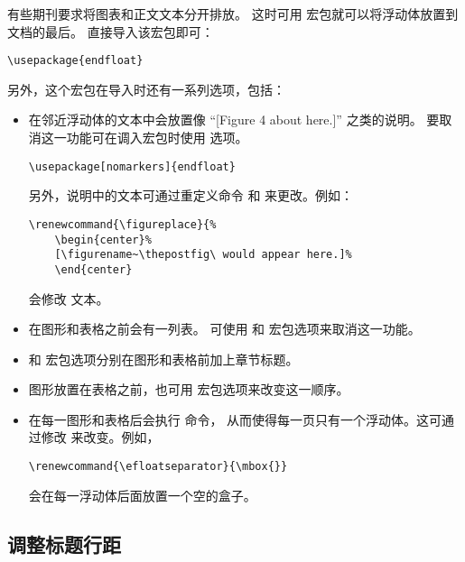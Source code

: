 有些期刊要求将图表和正文文本分开排放。
这时可用  宏包就可以将浮动体放置到文档的最后。
直接导入该宏包即可：
\begin{lstlisting}
\usepackage{endfloat}
\end{lstlisting}
另外，这个宏包在导入时还有一系列选项，包括：
\begin{itemize}
	\item 在邻近浮动体的文本中会放置像 ``[Figure 4 about here.]'' 之类的说明。
	要取消这一功能可在调入宏包时使用  选项。
\begin{lstlisting}
\usepackage[nomarkers]{endfloat}
\end{lstlisting}
	另外，说明中的文本可通过重定义命令  和  来更改。例如：
\begin{lstlisting}
\renewcommand{\figureplace}{% 
	\begin{center}% 
	[\figurename~\thepostfig\ would appear here.]% 
	\end{center}
\end{lstlisting}
	会修改  文本。
	
	\item 在图形和表格之前会有一列表。
	可使用  和  宏包选项来取消这一功能。
	
	\item {} 和  宏包选项分别在图形和表格前加上章节标题。
	
	\item 图形放置在表格之前，也可用  宏包选项来改变这一顺序。
	
	\item 在每一图形和表格后会执行  命令，
	从而使得每一页只有一个浮动体。这可通过修改  来改变。例如，
\begin{lstlisting}
\renewcommand{\efloatseparator}{\mbox{}}
\end{lstlisting}
	会在每一浮动体后面放置一个空的盒子。
\end{itemize}

\subsection{调整标题行距}\label{ssec:caplinspacing}

